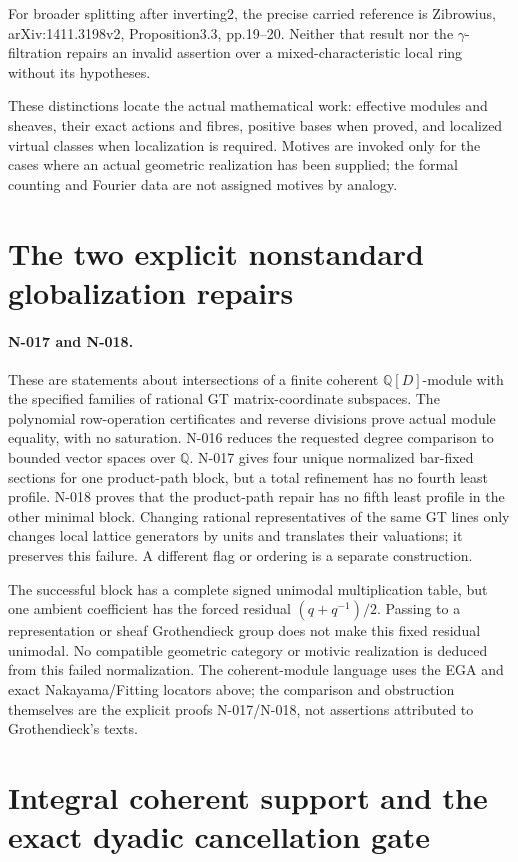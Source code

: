 For broader splitting after inverting2, the precise carried
reference is Zibrowius, arXiv:1411.3198v2, Proposition3.3,
pp.19--20.  Neither that result nor the $\gamma$-filtration
repairs an invalid assertion over a mixed-characteristic
local ring without its hypotheses.

These distinctions locate the actual mathematical work:
effective modules and sheaves, their exact actions and
fibres, positive bases when proved, and localized virtual
classes when localization is required.  Motives are invoked
only for the cases where an actual geometric realization
has been supplied; the formal counting and Fourier data
are not assigned motives by analogy.

\section{The two explicit nonstandard globalization repairs}
\paragraph{N-017 and N-018.}
These are statements about intersections of a finite coherent
$\mathbb Q[D]$-module with the specified families of rational GT matrix-coordinate
subspaces. The polynomial row-operation certificates and reverse
divisions prove actual module equality, with no saturation.
N-016 reduces the requested degree comparison to bounded vector
spaces over $\mathbb Q$. N-017 gives four unique normalized
bar-fixed sections for one product-path block, but a total refinement
has no fourth least profile. N-018 proves that the product-path
repair has no fifth least profile in the other minimal block.
Changing rational representatives of the same GT lines only changes
local lattice generators by units and translates their valuations;
it preserves this failure. A different flag or ordering is a
separate construction.

The successful block has a complete signed unimodal multiplication
table, but one ambient coefficient has the forced residual
$(q+q^{-1})/2$. Passing to a representation or sheaf
Grothendieck group does not make this fixed residual unimodal. No compatible geometric category or motivic realization
is deduced from this failed normalization. The coherent-module
language uses the EGA and exact Nakayama/Fitting locators above;
the comparison and obstruction themselves are the explicit proofs
N-017/N-018, not assertions attributed to Grothendieck's texts.

\section{Integral coherent support and the exact dyadic cancellation gate}
